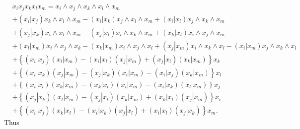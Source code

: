 \documentclass[aps, preprint]{revtex4}
\begin{document}
\begin{align} & x_{i} x_{j} x_{k} x_{l} x_{m} =x_{i} \wedge x_{j} \wedge x_{k} \wedge x_{l} \wedge x_{m} \nonumber  \\
 &  +\left (\left .x_{i}\right \vert x_{j}\right ) x_{k} \wedge x_{l} \wedge x_{m} -\left (\left .x_{i}\right \vert x_{k}\right ) x_{j} \wedge x_{l} \wedge x_{m} +\left (\left .x_{i}\right \vert x_{l}\right ) x_{j} \wedge x_{k} \wedge x_{m} \nonumber  \\
 &  +\left (\left .x_{j}\right \vert x_{k}\right ) x_{i} \wedge x_{l} \wedge x_{m} -\left (\left .x_{j}\right \vert x_{l}\right ) x_{i} \wedge x_{k} \wedge x_{m} +\left (\left .x_{k}\right \vert x_{l}\right ) x_{i} \wedge x_{j} \wedge x_{m} \nonumber  \\
 &  +\left (\left .x_{l}\right \vert x_{m}\right ) x_{i} \wedge x_{j} \wedge x_{k} -\left (\left .x_{k}\right \vert x_{m}\right ) x_{i} \wedge x_{j} \wedge x_{l} +\left (\left .x_{j}\right \vert x_{m}\right ) x_{i} \wedge x_{k} \wedge x_{l} -\left (\left .x_{i}\right \vert x_{m}\right ) x_{j} \wedge x_{k} \wedge x_{l} \nonumber  \\
 &  +\left \{\left (\left .x_{i}\right \vert x_{j}\right ) \left (\left .x_{l}\right \vert x_{m}\right ) -\left (\left .x_{i}\right \vert x_{l}\right ) \left (\left .x_{j}\right \vert x_{m}\right ) +\left (\left .x_{j}\right \vert x_{l}\right ) \left (\left .x_{k}\right \vert x_{m}\right )\right \} x_{k} \nonumber  \\
 &  +\left \{\left (\left .x_{i}\right \vert x_{k}\right ) \left (\left .x_{j}\right \vert x_{m}\right ) -\left (\left .x_{j}\right \vert x_{k}\right ) \left (\left .x_{i}\right \vert x_{m}\right ) -\left (\left .x_{i}\right \vert x_{j}\right ) \left (\left .x_{k}\right \vert x_{m}\right )\right \} x_{l} \nonumber  \\
 &  +\left \{\left (\left .x_{i}\right \vert x_{l}\right ) \left (\left .x_{k}\right \vert x_{m}\right ) -\left (\left .x_{k}\right \vert x_{l}\right ) \left (\left .x_{i}\right \vert x_{m}\right ) -\left (\left .x_{i}\right \vert x_{k}\right ) \left (\left .x_{l}\right \vert x_{m}\right )\right \} x_{j} \nonumber  \\
 &  +\left \{\left (\left .x_{j}\right \vert x_{k}\right ) \left (\left .x_{l}\right \vert x_{m}\right ) -\left (\left .x_{j}\right \vert x_{l}\right ) \left (\left .x_{k}\right \vert x_{m}\right ) +\left (\left .x_{k}\right \vert x_{l}\right ) \left (\left .x_{j}\right \vert x_{m}\right )\right \} x_{i} \nonumber  \\
 &  +\left \{\left (\left .x_{i}\right \vert x_{j}\right ) \left (\left .x_{k}\right \vert x_{l}\right ) -\left (\left .x_{i}\right \vert x_{k}\right ) \left (\left .x_{j}\right \vert x_{l}\right ) +\left (\left .x_{i}\right \vert x_{l}\right ) \left (\left .x_{j}\right \vert x_{k}\right )\right \} x_{m}\text{.}\end{align}Thus
\end{document}
